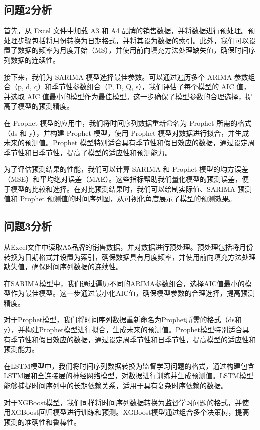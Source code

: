 \documentclass[a4paper]{article}
\begin{document}
	\subsection{问题2分析}
	首先，从 Excel 文件中加载 A3 和 A4 品牌的销售数据，并将数据进行预处理。预处理步骤包括将月份转换为日期格式，并将其设为数据的索引。此外，我们可以设置了数据的频率为月度开始（MS），并使用前向填充方法处理缺失值，确保时间序列数据的连续性。

接下来，我们为 SARIMA 模型选择最佳参数。可以通过遍历多个 ARIMA 参数组合（p, d, q）和季节性参数组合（P, D, Q, s），我们评估了每个模型的 AIC 值，并选取 AIC 值最小的模型作为最佳模型。这一步确保了模型参数的合理选择，提高了模型的预测精度。

在 Prophet 模型的应用中，我们将时间序列数据重新命名为 Prophet 所需的格式（ds 和 y），并构建 Prophet 模型，使用 Prophet 模型对数据进行拟合，并生成未来的预测值。Prophet 模型特别适合具有季节性和假日效应的数据，通过设定周季节性和日季节性，提高了模型的适应性和预测能力。

为了评估预测结果的性能，我们可以计算 SARIMA 和 Prophet 模型的均方误差（MSE）和平均绝对误差（MAE）。这些指标帮助我们量化模型的预测误差，便于模型的比较和选择。在对比预测结果时，我们可以绘制实际值、SARIMA 预测值和 Prophet 预测值的时间序列图，从可视化角度展示了模型的预测效果。
	\subsection{问题3分析}
	从Excel文件中读取A5品牌的销售数据，并对数据进行预处理。预处理包括将月份转换为日期格式并设置为索引，确保数据具有月度频率，并使用前向填充方法处理缺失值，确保时间序列数据的连续性。

在SARIMA模型中，我们通过遍历不同的ARIMA参数组合，选择AIC值最小的模型作为最佳模型。这一步通过最小化AIC值，确保模型参数的合理选择，提高预测精度。

对于Prophet模型，我们将时间序列数据重新命名为Prophet所需的格式（ds和y），并构建Prophet模型进行拟合，生成未来的预测值。Prophet模型特别适合具有季节性和假日效应的数据，通过设定周季节性和日季节性，提高模型的适应性和预测能力。

在LSTM模型中，我们将时间序列数据转换为监督学习问题的格式，通过构建包含LSTM层和全连接层的神经网络模型，对数据进行训练并生成预测值。LSTM模型能够捕捉时间序列中的长期依赖关系，适用于具有复杂时序依赖的数据。

对于XGBoost模型，我们同样将时间序列数据转换为监督学习问题的格式，并使用XGBoost回归模型进行训练和预测。XGBoost模型通过组合多个决策树，提高预测的准确性和鲁棒性。
\end{document}
